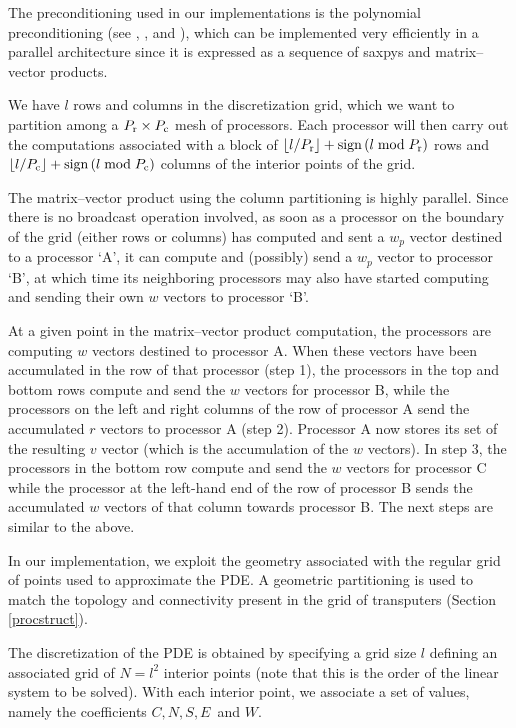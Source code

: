 \documentclass{ecai2014}
\begin{document}
The preconditioning used in our implementations is the polynomial
preconditioning (see \cite{kn:Saad85}, \cite{kn:Eisenstat81},
\cite{kn:Adams85} and \cite{kn:Johnson83}), which can be implemented
very efficiently in a parallel architecture since it is expressed as a
sequence of saxpys and matrix--vector products.

We have $l$ rows and columns in the discretization grid, which we want
to partition among a $P_{\rm{r}}\times P_{\rm{c}}$ mesh of
processors. Each processor will then carry out the computations
associated with a block of $\lfloor
l/P_{\rm{r}}\rfloor+\hbox{sign}\left( l\bmod P_{\rm{r}}\right)$ rows
and $\lfloor l/P_{\rm{c}}\rfloor+\hbox{sign}\left( l\bmod
  P_{\rm{c}}\right)$ columns of the interior points of the grid.

The matrix--vector product using the column partitioning is highly
parallel. Since there is no broadcast operation involved, as soon as a
processor on the boundary of the grid (either rows or columns) has
computed and sent a $w_{p}$ vector destined to a processor `A', it can
compute and (possibly) send a $w_{p}$ vector to processor `B', at
which time its neighboring processors may also have started computing
and sending their own $w$ vectors to processor `B'.

At a given point in the matrix--vector product computation, the
processors are computing $w$ vectors destined to processor A. When
these vectors have been accumulated in the row of that processor (step
1), the processors in the top and bottom rows compute and send the $w$
vectors for processor B, while the processors on the left and right
columns of the row of processor A send the accumulated $r$ vectors to
processor A (step 2). Processor A now stores its set of the resulting
$v$ vector (which is the accumulation of the $w$ vectors). In step 3,
the processors in the bottom row compute and send the $w$ vectors for
processor C while the processor at the left-hand end of the row of
processor B sends the accumulated $w$ vectors of that column towards
processor B. The next steps are similar to the above.

In our implementation, we exploit the geometry associated with the
regular grid of points used to approximate the PDE. A geometric
partitioning is used to match the topology and connectivity present in
the grid of transputers (Section \ref{procstruct}).

The discretization of the PDE is obtained by specifying a grid size
$l$ defining an associated grid of $N=l^2$ interior points (note that
this is the order of the linear system to be solved). With each
interior point, we associate a set of values, namely the coefficients
$C, N, S, E\,$ and $W$.
\end{document}
